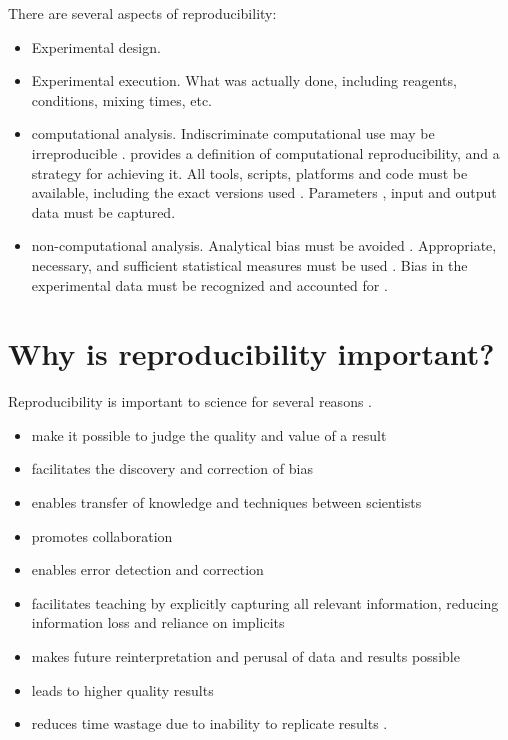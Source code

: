 There are several aspects of reproducibility: 
\begin{itemize}

  \item Experimental design.

  \item Experimental execution.  What was actually done, including reagents, conditions,
    mixing times, etc.

  \item computational analysis.  Indiscriminate computational use may be irreproducible \cite{donoho2009, peng2011reproducible}.  
    \cite{donoho_wavelab} provides a definition of computational reproducibility, and a strategy for achieving it.
    All tools, scripts, platforms and code must be available, including the exact versions used
    \cite{ince2012open, nekrutenko2012next, blankenberg2014dissemination}.
    Parameters \cite{landis2012call}, input and output data must be captured.

  \item non-computational analysis.  Analytical bias must be avoided \cite{sackett1979bias}.
    Appropriate, necessary, and sufficient statistical measures must be used 
    \cite{ioannidis2005most, nuzzo2014statistical, begley2013reproducibility,
          pashler2012replicability, vaux2012numbers}.
    Bias in the experimental data must be recognized
    and accounted for \cite{macarthur2012reproducibility, wagenmakers2012agenda}.

\end{itemize}



\section{Why is reproducibility important?}
Reproducibility is important to science for several reasons \cite{borgman2012conundrum}.
\begin{itemize}
  \item make it possible to judge the quality and value of a result
  \item facilitates the discovery and correction of bias
  \item enables transfer of knowledge and techniques between scientists \cite{rung2013reuse}
  \item promotes collaboration
  \item enables error detection and correction
  \item facilitates teaching by explicitly capturing all relevant information,
        reducing information loss and reliance on implicits
  \item makes future reinterpretation and perusal of data and results possible
  \item leads to higher quality results
  \item reduces time wastage due to inability to replicate results 
        \cite{ioannidis2005most, mullard2011reliability, prinz2011reproducibility, begley2012drug}. 
\end{itemize}

